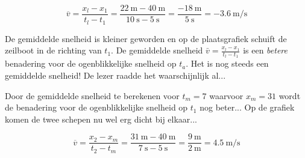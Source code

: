 \documentclass{ximera}
\begin{document}
\[
\overline{v}=\frac{x_l-x_1}{t_l-t_1}=\frac{\SI{22}{\meter} - \SI{40}{\meter}}{\SI{10}{\second} - \SI{5}{\second}}=  \frac{\SI{-18}{\meter}}{\SI{5}{\second}} = \SI{-3.6}{\meter\per\second}
\]

De gemiddelde snelheid is kleiner geworden en op de plaatsgrafiek schuift de zeilboot in de richting van \(t_1\). 
De gemiddelde snelheid \(\bar{v} = \frac{x_l - x_1}{t_l-t_1}\) is een \textit{betere} benadering voor de ogenblikkelijke snelheid op \(t_a\). 
Het is nog steeds een gemiddelde snelheid! 
De lezer raadde het waarschijnlijk al...

Door de gemiddelde snelheid te berekenen voor \(t_m = 7\) waarvoor \(x_m = 31\) wordt de benadering voor de ogenblikkelijke snelheid op \(t_1\) nog beter... 
Op de grafiek komen de twee schepen nu wel erg dicht bij elkaar... 

\[
\overline{v}=\frac{x_2-x_m}{t_2-t_m}=\frac{\SI{31}{\meter} - \SI{40}{\meter}}{\SI{7}{\second} - \SI{5}{\second}}=  \frac{\SI{9}{\meter}}{\SI{2}{\meter}} = \SI{4.5}{\meter\per\second}
\]


\end{document}
